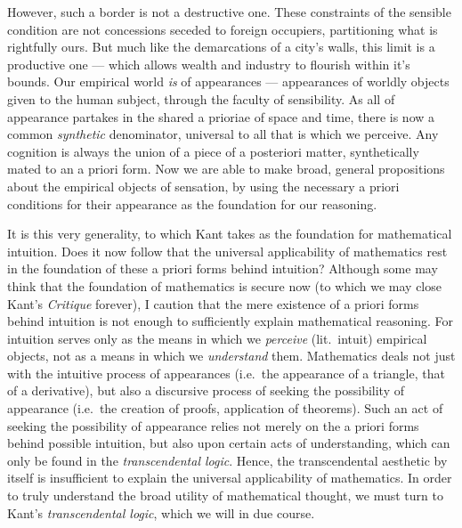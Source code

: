 \noindent
However, such a border is not a destructive one. These constraints of the sensible condition are not concessions seceded to foreign occupiers, partitioning what is rightfully ours. But much like the demarcations of a city's walls, this limit is a productive one --- which allows wealth and industry to flourish within it's bounds. Our empirical world \emph{is} of appearances --- appearances of worldly objects given to the human subject, through the faculty of sensibility. As all of appearance partakes in the shared a prioriae of space and time, there is now a common \emph{synthetic} denominator, universal to all that is which we perceive. Any cognition is always the union of a piece of a posteriori matter, synthetically mated to an a priori form. Now we are able to make broad, general propositions about the empirical objects of sensation, by using the necessary a priori conditions for their appearance as the foundation for our reasoning.

\noindent
It is this very generality, to which Kant takes as the foundation for mathematical intuition. Does it now follow that the universal applicability of mathematics rest in the foundation of these a priori forms behind intuition? Although some may think that the foundation of mathematics is secure now (to which we may close Kant's \emph{Critique} forever), I caution that the mere existence of a priori forms behind intuition is not enough to sufficiently explain mathematical reasoning. For intuition serves only as the means in which we \emph{perceive} (lit.\ intuit) empirical objects, not as a means in which we \emph{understand} them. Mathematics deals not just with the intuitive process of appearances (i.e.\ the appearance of a triangle, that of a derivative), but also a discursive process of seeking the possibility of appearance (i.e.\ the creation of proofs, application of theorems). Such an act of seeking the possibility of appearance relies not merely on the a priori forms behind possible intuition, but also upon certain acts of understanding, which can only be found in the \emph{transcendental logic}. Hence, the transcendental aesthetic by itself is insufficient to explain the universal applicability of mathematics. In order to truly understand the broad utility of mathematical thought, we must turn to Kant's \emph{transcendental logic}, which we will in due course.

